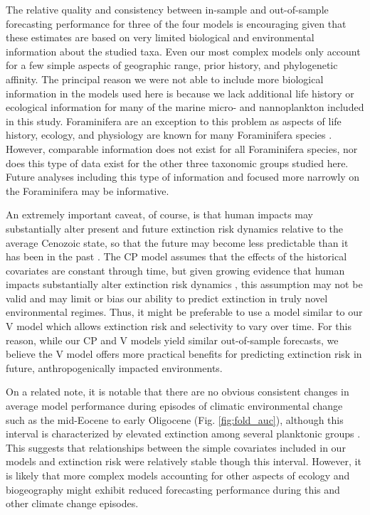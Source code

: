 \documentclass[12pt,letterpaper]{article}
\begin{document}
\begin{refsection}
The relative quality and consistency between in-sample and out-of-sample forecasting performance for three of the four models is encouraging given that these estimates are based on very limited biological and environmental information about the studied taxa. Even our most complex models only account for a few simple aspects of geographic range, prior history, and phylogenetic affinity. The principal reason we were not able to include more biological information in the models used here is because we lack additional life history or ecological information for many of the marine micro- and nannoplankton included in this study. Foraminifera are an exception to this problem as aspects of life history, ecology, and physiology are known for many Foraminifera species \citep{Ezard2011}. However, comparable information does not exist for all Foraminifera species, nor does this type of data exist for the other three taxonomic groups studied here. Future analyses including this type of information and focused more narrowly on the Foraminifera may be informative. 

An extremely important caveat, of course, is that human impacts may substantially alter present and future extinction risk dynamics relative to the average Cenozoic state, so that the future may become less predictable than it has been in the past \citep{Harnik2012a,Finnegan2015}. The CP model assumes that the effects of the historical covariates are constant through time, but given growing evidence that human impacts substantially alter extinction risk dynamics \citep{Harnik2012a,Finnegan2015,Payne2007}, this assumption may not be valid and may limit or bias our ability to predict extinction in truly novel environmental regimes. Thus, it might be preferable to use a model similar to our V model which allows extinction risk and selectivity to vary over time. For this reason, while our CP and V models yield similar out-of-sample forecasts, we believe the V model offers more practical benefits for predicting extinction risk in future, anthropogenically impacted environments.

On a related note, it is notable that there are no obvious consistent changes in average model performance during episodes of climatic environmental change such as the mid-Eocene to early Oligocene (Fig. \ref{fig:fold_auc}), although this interval is characterized by elevated extinction among several planktonic groups \citep{Prothero1994,Wade2008,Kamikuri2012}. This suggests that relationships between the simple covariates included in our models and extinction risk were relatively stable though this interval.  However, it is likely that more complex models accounting for other aspects of ecology and biogeography might exhibit reduced forecasting performance during this and other climate change episodes.


\end{refsection}
\end{document}
